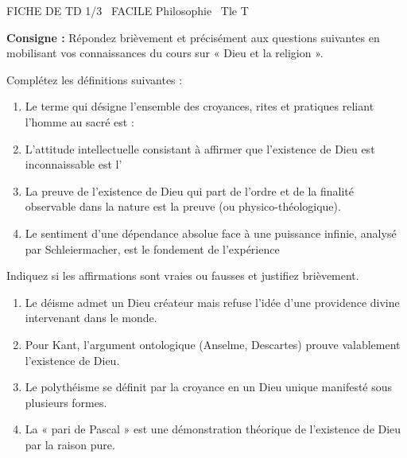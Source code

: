 \documentclass[11pt]{article}
\begin{document}
\begin{tcolorbox}[enhanced,colback=popink,colframe=popink,arc=10pt,boxrule=0pt,left=12pt,right=12pt,top=9pt,bottom=9pt]
{\color{white}\popxbold\small FICHE DE TD 1/3 \textbullet\ FACILE \hfill Philosophie \textbullet\ Tle T\par}
\end{tcolorbox}
\vspace{4pt}
\noindent \textbf{Consigne :} Répondez brièvement et précisément aux questions suivantes en mobilisant vos connaissances du cours sur « Dieu et la religion ».

\begin{exercice}
Complétez les définitions suivantes :
\begin{enumerate}
    \item Le terme qui désigne l'ensemble des croyances, rites et pratiques reliant l'homme au sacré est : \dotfill
    \item L'attitude intellectuelle consistant à affirmer que l'existence de Dieu est inconnaissable est l'\dotfill
    \item La preuve de l'existence de Dieu qui part de l'ordre et de la finalité observable dans la nature est la preuve \dotfill (ou physico-théologique).
    \item Le sentiment d'une dépendance absolue face à une puissance infinie, analysé par Schleiermacher, est le fondement de l'expérience \dotfill
\end{enumerate}
\end{exercice}

\begin{exercice}
Indiquez si les affirmations sont vraies ou fausses et justifiez brièvement.
\begin{enumerate}
    \item Le déisme admet un Dieu créateur mais refuse l'idée d'une providence divine intervenant dans le monde.
    \item Pour Kant, l'argument ontologique (Anselme, Descartes) prouve valablement l'existence de Dieu.
    \item Le polythéisme se définit par la croyance en un Dieu unique manifesté sous plusieurs formes.
    \item La « pari de Pascal » est une démonstration théorique de l'existence de Dieu par la raison pure.
\end{enumerate}
\end{exercice}
\end{document}
